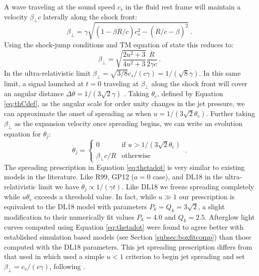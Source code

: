 \documentclass[twocolumn]{aastex62}
\newcommand{\thC}{\ensuremath{\theta_{\mathrm{c}}}}
\begin{document}
A wave traveling at the sound speed $c_s$ in the fluid rest frame will maintain a velocity $\beta_{\bot} c$ laterally along the shock front:
\begin{equation}
	\beta_\bot = \gamma \sqrt{ (1-\beta \dot{R}/c)c_s^2 - (\dot{R}/c - \beta)^2} \ .
\end{equation}
Using the shock-jump conditions and TM equation of state this reduces to:
\begin{equation}
	\beta_\bot = \sqrt{\frac{2u^2+3}{4u^2+3}} \frac{\dot{R}}{2\gamma c}\ . \label{eq:spreadVel}
\end{equation}
In the ultra-relativistic limit $\beta_\bot = \sqrt{3/8} c_s/(c\gamma) = 1/(\sqrt{8} \gamma)$.  In this same limit, a signal launched at $t=0$ traveling at $\beta_\bot$ along the shock front will cover an angular distance  $\Delta \theta = 1/(3\sqrt{2}\gamma)$ \citep{van-Eerten:2012aa}.  Taking $\thC$, defined by Equation \eqref{eq:thCdef}, as the angular scale for order unity changes in the jet pressure, we can approximate the onset of spreading as when $u = 1/(3\sqrt{2}\thC)$.  Further taking $\beta_\bot$ as the expansion velocity once spreading begins, we can write an evolution equation for $\theta_j$:
\begin{equation}
	\dot{\theta}_j = \begin{cases}
					0 & \text{if } u > 1/(3\sqrt{2} \thC)\\
					\beta_\bot c / R &\text{otherwise}
				\end{cases}\ . \label{eq:thetadot}
\end{equation}
The spreading prescription in Equation \eqref{eq:thetadot} is very similar to existing models in the literature.  Like R99, GP12 ($a=0$ case), and DL18 in the ultra-relativistic limit we have $\dot{\theta}_j \propto 1/(\gamma t)$.  Like DL18 we freeze spreading completely while $u \thC$ exceeds a threshold value.  In fact, while $u \gg 1$ our prescription is equivalent to the DL18 model with parameters $P_k = Q_k = 3\sqrt{2}$, a slight modification to their numerically fit values $P_k = 4.0$ and $Q_k = 2.5$.  Afterglow light curves computed using Equation \eqref{eq:thetadot} were found to agree better with established simulation based models (see Section \ref{subsec:boxfitcomp}) than those computed with the DL18 parameters.  This jet spreading prescription differs from that used in \citet{Troja:2018aa, Piro:2019aa, Troja:2019ab} which used a simple $u < 1$ criterion to begin jet spreading and set $\beta_\bot = c_s / (c \gamma)$, following \citet{van-Eerten:2010aa}.
\end{document}
